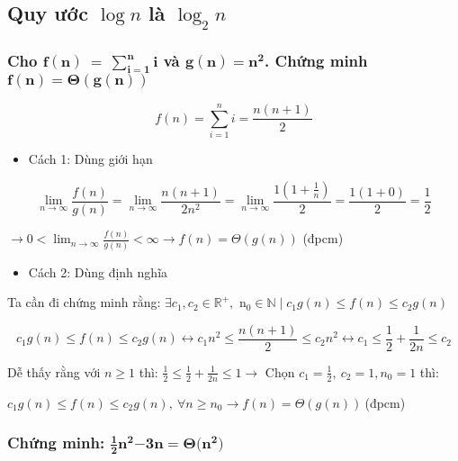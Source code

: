 \subsection{Quy ước \(\log n\) là \(\log_2 n\)}

\subsubsection{  \textbf{Cho}
  \(\mathbf{f(n)\  = \ }\sum_{\mathbf{i = 1}}^{\mathbf{n}}\mathbf{i}\)
  \textbf{và} \(\mathbf{g(n) =}\mathbf{n}^{\mathbf{2}}\)\textbf{. Chứng
  minh} \(\mathbf{f(n) = \Theta(g(n))}\)
}
\[f(n) = \sum_{i = 1}^{n}{i = \frac{n(n + 1)}{2}}\]

\begin{itemize}
\item
  Cách 1: Dùng giới hạn
\end{itemize}

\[\lim_{n \rightarrow \infty}{\frac{f(n)}{g(n)} = \lim_{n \rightarrow \infty}{\frac{n(n + 1)}{2n^{2}} = \lim_{n \rightarrow \infty}{\frac{1(1 + \frac{1}{n})}{2} = \frac{1(1 + 0)}{2}}}} = \frac{1}{2}\]

\(\rightarrow 0 < \lim_{n \rightarrow \infty}\frac{f(n)}{g(n)} < \infty \rightarrow f(n) = \Theta(g(n))\)
(đpcm)

\begin{itemize}
\item
  Cách 2: Dùng định nghĩa
\end{itemize}

Ta cần đi chứng minh rằng:
\(\exists c_{1},c_{2} \in \mathbb{R}^{+}, \text{\ n}_{0} \in \mathbb{N}\mid c_{1}g(n) \leq f(n) \leq c_{2}g(n)\)

\[c_{1}g(n) \leq f(n) \leq c_{2}g(n) \leftrightarrow c_{1}n^{2} \leq \frac{n(n + 1)}{2} \leq c_{2}n^{2} \leftrightarrow c_{1} \leq \frac{1}{2} + \frac{1}{2n} \leq c_{2}\]

Dễ thấy rằng với \(n \geq 1\) thì:
\(\frac{1}{2} \leq \frac{1}{2} + \frac{1}{2n} \leq 1 \rightarrow\) Chọn
\(c_{1} = \frac{1}{2},\ c_{2} = 1,n_{0} = 1\) thì:

\(c_{1}g(n) \leq f(n) \leq c_{2}g(n),\ \forall n \geq n_{0} \rightarrow f(n) = \Theta(g(n))\ \)(đpcm)

\subsubsection{  \textbf{Chứng minh:}
  \(\frac{\mathbf{1}}{\mathbf{2}}\mathbf{n}^{\mathbf{2}}\mathbf{- 3}\mathbf{n}\mathbf{= \Theta(}\mathbf{n}^{\mathbf{2}}\mathbf{)}\)}

